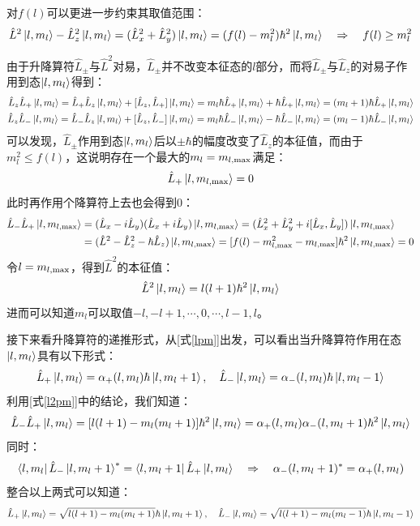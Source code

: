 对$f(l)$可以更进一步约束其取值范围：
\[\hat{L}^2\ket{l,m_l}-\hat{L}_z^2\ket{l,m_l}=(\hat{L}_x^2+\hat{L}_y^2)\ket{l,m_l}=(f(l)-m_l^2)\hbar^2\ket{l,m_l} \quad \Rightarrow \quad f(l) \geq m_l^2\]

由于升降算符$\hat{L}_{\pm}$与$\hat{L}^2$对易，$\hat{L}_{\pm}$并不改变本征态的$l$部分，而将$\hat{L}_{\pm}$与$\hat{L}_z$的对易子作用到态$\ket{l,m_l}$得到：
\begin{equation}
\begin{aligned}\label{lpm}
\hat{L}_z\hat{L}_+\ket{l,m_l}=\hat{L}_+\hat{L}_z\ket{l,m_l}+[\hat{L}_z,\hat{L}_+]\ket{l,m_l}=m_l\hbar\hat{L}_+\ket{l,m_l}+\hbar\hat{L}_+\ket{l,m_l}=(m_l+1)\hbar\hat{L}_+\ket{l,m_l} \\ \hat{L}_z\hat{L}_-\ket{l,m_l}=\hat{L}_-\hat{L}_z\ket{l,m_l}+[\hat{L}_z,\hat{L}_-]\ket{l,m_l}=m_l\hbar\hat{L}_-\ket{l,m_l}-\hbar\hat{L}_-\ket{l,m_l}=(m_l-1)\hbar\hat{L}_-\ket{l,m_l}
\end{aligned}    
\end{equation}
可以发现，$\hat{L}_{\pm}$作用到态$\ket{l,m_l}$后以$\pm\hbar$的幅度改变了$\hat{L}_z$的本征值，而由于$m_l^2 \leq f(l)$，这说明存在一个最大的$m_l=m_{l,\rm{max}}$满足：
\[\hat{L}_+\ket{l,m_{l,\rm{max}}}=0\]
此时再作用个降算符上去也会得到0：
\begin{equation}
\begin{aligned}\label{l2pm}
\hat{L}_-\hat{L}_+\ket{l,m_{l,\rm{max}}}&=(\hat{L}_x-i\hat{L}_y)(\hat{L}_x+i\hat{L}_y)\ket{l,m_{l,\rm{max}}}=(\hat{L}_x^2+\hat{L}_y^2+i[\hat{L}_x,\hat{L}_y])\ket{l,m_{l,\rm{max}}}\\
&=(\hat{L}^2-\hat{L}_z^2-\hbar\hat{L}_z)\ket{l,m_{l,\rm{max}}}=[f(l)-m_{l,\rm{max}}^2-m_{l,\rm{max}}]\hbar^2\ket{l,m_{l,\rm{max}}}=0
\end{aligned}
\end{equation}
令$l=m_{l,\rm{max}}$，得到$\hat{L}^2$的本征值：
\[\hat{L}^2\ket{l,m_l}=l(l+1)\hbar^2\ket{l,m_l}\]
进而可以知道$m_l$可以取值$-l,-l+1,\cdots,0,\cdots,l-1,l$。

接下来看升降算符的递推形式，从[式\eqref{lpm}]出发，可以看出当升降算符作用在态$\ket{l,m_l}$具有以下形式：
\[\hat{L}_+\ket{l,m_l}=\alpha_+(l,m_l)\hbar\ket{l,m_l+1}, \quad \hat{L}_-\ket{l,m_l}=\alpha_-(l,m_l)\hbar\ket{l,m_l-1}\]
利用[式\eqref{l2pm}]中的结论，我们知道：
\[\hat{L}_-\hat{L}_+\ket{l,m_l}=[l(l+1)-m_l(m_l+1)]\hbar^2\ket{l,m_l}=\alpha_+(l,m_l)\alpha_-(l,m_l+1)\hbar^2\ket{l,m_l}\]
同时：
\[\bra{l,m_l}\hat{L}_-\ket{l,m_l+1}^*=\bra{l,m_l+1}\hat{L}_+\ket{l,m_l} \quad \Rightarrow \quad \alpha_-(l,m_l+1)^*=\alpha_+(l,m_l)\]
整合以上两式可以知道：
\[\hat{L}_+\ket{l,m_l}=\sqrt{l(l+1)-m_l(m_l+1)}\hbar\ket{l,m_l+1}, \quad \hat{L}_-\ket{l,m_l}=\sqrt{l(l+1)-m_l(m_l-1)}\hbar\ket{l,m_l-1}\]

